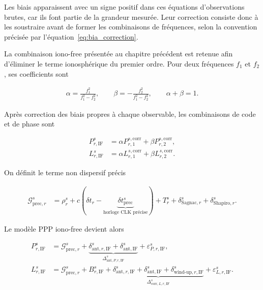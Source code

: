 Les biais apparaissent avec un signe positif dans ces équations d'observations
brutes, car ils font partie de la grandeur mesurée. Leur correction consiste
donc à les soustraire avant de former les combinaisons de fréquences, selon la
convention précisée par l'équation~\eqref{eq:bia_correction}.

La combinaison iono-free présentée au chapitre précédent est retenue
afin d'éliminer le terme ionosphérique du premier ordre. Pour deux fréquences
$f_1$ et $f_2$, ses coefficients sont

\begin{align}
\alpha=\frac{f_1^2}{f_1^2-f_2^2},
\qquad
\beta=-\frac{f_2^2}{f_1^2-f_2^2},
\qquad
\alpha+\beta=1.
\label{eq:ppp_if_coefficients}
\end{align}

Après correction des biais propres à chaque observable, les combinaisons de
code et de phase sont

\begin{align}
P_{r,\mathrm{IF}}^s
&=\alpha P_{r,1}^{s,\mathrm{corr}}
+\beta P_{r,2}^{s,\mathrm{corr}},
\\
L_{r,\mathrm{IF}}^s
&=\alpha L_{r,1}^{s,\mathrm{corr}}
+\beta L_{r,2}^{s,\mathrm{corr}}.
\label{eq:ppp_if_observations}
\end{align}

On définit le terme non dispersif précis

\begin{align}
\mathcal G_{\mathrm{prec},r}^s
&=
\rho_r^s
+c\left(
\delta t_r-
\underbrace{\delta t_{\mathrm{prec}}^s}_{\text{horloge CLK précise}}
\right)
+T_r^s
+\delta_{\mathrm{Sagnac},r}^s
+\delta_{\mathrm{Shapiro},r}^s.
\label{eq:ppp_precise_common_term}
\end{align}

Le modèle PPP iono-free devient alors

\begin{align}
P_{r,\mathrm{IF}}^s
&=\mathcal G_{\mathrm{prec},r}^s
+\underbrace{
\delta_{\mathrm{ant},r,\mathrm{IF}}^s
+\delta_{\mathrm{ant},\mathrm{IF}}^{s}
}_{\Delta_{\mathrm{ant},P,r,\mathrm{IF}}^s}
+\varepsilon_{P,r,\mathrm{IF}}^s,
\label{eq:ppp_code_if}
\\
L_{r,\mathrm{IF}}^s
&=\mathcal G_{\mathrm{prec},r}^s
+B_{r,\mathrm{IF}}^s
+\underbrace{
\delta_{\mathrm{ant},r,\mathrm{IF}}^s
+\delta_{\mathrm{ant},\mathrm{IF}}^{s}
+\delta_{\mathrm{wind\text{-}up},r,\mathrm{IF}}^s
}_{\Delta_{\mathrm{corr},L,r,\mathrm{IF}}^s}
+\varepsilon_{L,r,\mathrm{IF}}^s.
\label{eq:ppp_phase_if}
\end{align}

